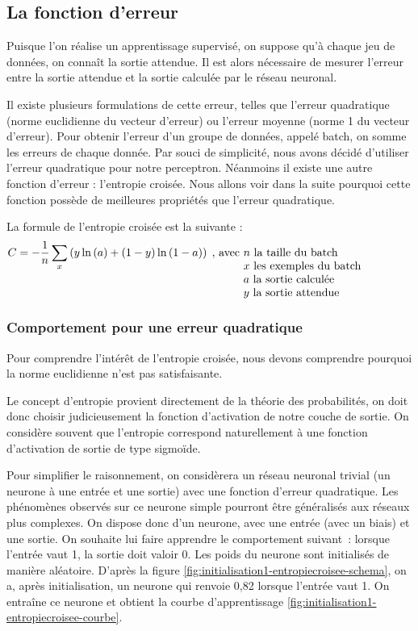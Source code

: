 \subsection{La fonction d'erreur}

Puisque l'on réalise un apprentissage supervisé, on suppose qu'à chaque jeu de données, on connaît la sortie attendue. Il est alors nécessaire de mesurer l'erreur entre la sortie attendue et la sortie calculée par le réseau neuronal.

Il existe plusieurs formulations de cette erreur, telles que l'erreur quadratique (norme euclidienne du vecteur d'erreur) ou l'erreur moyenne (norme 1 du vecteur d'erreur).
Pour obtenir l'erreur d'un groupe de données, appelé batch, on somme les erreurs de chaque donnée. Par souci de simplicité, nous avons décidé d'utiliser l'erreur quadratique pour notre perceptron. Néanmoins il existe une autre fonction d'erreur : l'entropie croisée. Nous allons voir dans la suite pourquoi cette fonction possède de meilleures propriétés que l'erreur quadratique.

La formule de l'entropie croisée est la suivante : 
\begin{equation}
 C = -\frac{1}{n}\sum_x\left(y\ln\left(a\right) + \left(1-y\right)\ln\left(1-a\right)\right)\; \text{, avec \parbox[t]{15em}{$n$ la taille du batch\\ $x$ les exemples du batch\\
 $a$ la sortie calculée\\$y$ la sortie attendue}}
 \label{eq:formule-entropiecroisee}
\end{equation}

\subsubsection{Comportement pour une erreur quadratique}

Pour comprendre l'intérêt de l'entropie croisée, nous devons comprendre pourquoi la norme euclidienne n'est pas satisfaisante.

Le concept d'entropie provient directement de la théorie des probabilités, on doit donc choisir judicieusement la fonction d'activation de notre couche de sortie. On considère souvent que l'entropie correspond naturellement à une fonction d'activation de sortie de type sigmoïde.

Pour simplifier le raisonnement, on considèrera un réseau neuronal trivial (un neurone à une entrée et une sortie) avec une fonction d'erreur quadratique.
Les phénomènes observés sur ce neurone simple pourront être généralisés aux réseaux plus complexes. On dispose donc d'un neurone, avec une entrée (avec un biais) et une sortie. On souhaite lui faire apprendre le comportement suivant~: lorsque l'entrée vaut 1, la sortie doit valoir 0.
Les poids du neurone sont initialisés de manière aléatoire. D'après la figure \ref{fig:initialisation1-entropiecroisee-schema}, on a, après initialisation, un neurone qui renvoie 0,82 lorsque l'entrée vaut 1. On entraîne ce neurone et obtient la courbe d'apprentissage \ref{fig:initialisation1-entropiecroisee-courbe}.


